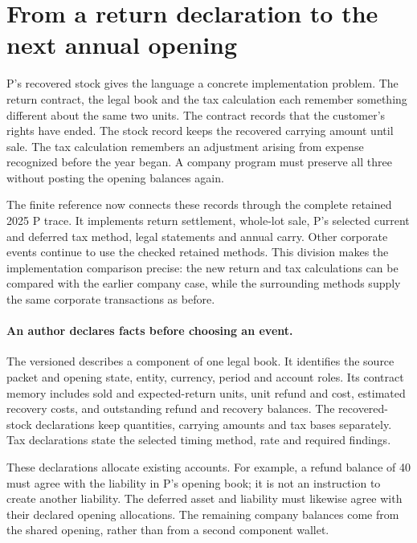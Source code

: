 \section{From a return declaration to the next annual opening}
\label{sec:company-return-reference}

P's recovered stock gives the language a concrete implementation problem.
The return contract, the legal book and the tax calculation each remember
something different about the same two units. The contract records that the
customer's rights have ended. The stock record keeps the recovered carrying
amount until sale. The tax calculation remembers an adjustment arising from
expense recognized before the year began. A company program must preserve
all three without posting the opening balances again.

The finite reference now connects these records through the complete retained
2025 P trace. It implements return settlement, whole-lot sale, P's selected
current and deferred tax method, legal statements and annual carry. Other
corporate events continue to use the checked retained methods. This division
makes the implementation comparison precise: the new return and tax
calculations can be compared with the earlier company case, while the
surrounding methods supply the same corporate transactions as before.

\paragraph{An author declares facts before choosing an event.}
The versioned  describes a component of
one legal book. It identifies the source packet and opening state, entity,
currency, period and account roles. Its contract memory includes sold and
expected-return units, unit refund and cost, estimated recovery costs, and
outstanding refund and recovery balances. The recovered-stock declarations
keep quantities, carrying amounts and tax bases separately. Tax declarations
state the selected timing method, rate and required findings.

These declarations allocate existing accounts. For example, a refund balance
of 40 must agree with the liability in P's opening book; it is not an
instruction to create another liability. The deferred asset and liability
must likewise agree with their declared opening allocations. The remaining
company balances come from the shared opening, rather than from a second
component wallet.

